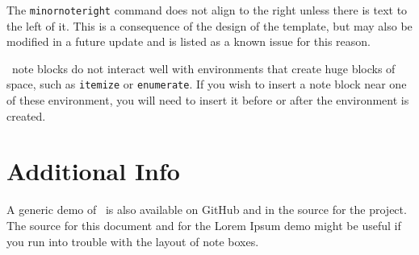 \documentclass{ClassTeX}
\begin{document}
	The \texttt{minornoteright} command does not align to the right unless there is text to the left of it.  This is a consequence of the design of the template, but may also be modified in a future update and is listed as a known issue for this reason.
	
	\ClassTeX\ note blocks do not interact well with environments that create huge blocks of space, such as \texttt{itemize} or \texttt{enumerate}.  If you wish to insert a note block near one of these environment, you will need to insert it before or after the environment is created.
	
	\section{Additional Info}
	A generic demo of \ClassTeX\ is also available on GitHub and in the source for the project. The source for this document and for the Lorem Ipsum demo might be useful if you run into trouble with the layout of note boxes.
	
	
\end{document}
